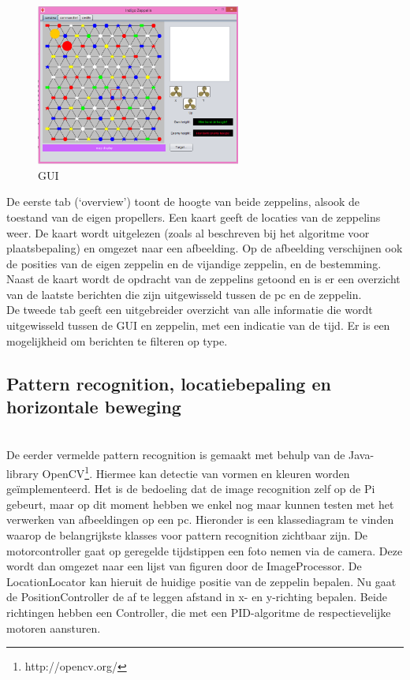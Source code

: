 \documentclass[tt]{penoverslag}
\begin{document}
\begin{figure}[H]
\begin{center}
\includegraphics[width=0.6\textwidth]{GUI.png}
\end{center}
\caption{GUI}
\label{GUI}
\end{figure}

De eerste tab (`overview') toont de hoogte van beide zeppelins, alsook de toestand van de eigen propellers. Een kaart geeft de locaties van de zeppelins weer. De kaart wordt uitgelezen (zoals al beschreven bij het algoritme voor plaatsbepaling) en omgezet naar een afbeelding. Op de afbeelding verschijnen ook de posities van de eigen zeppelin en de vijandige zeppelin, en de bestemming. Naast de kaart wordt de opdracht van de zeppelins getoond en is er een overzicht van de laatste berichten die zijn uitgewisseld tussen de pc en de zeppelin. \\

De tweede tab geeft een uitgebreider overzicht van alle informatie die wordt uitgewisseld tussen de GUI en zeppelin, met een indicatie van de tijd. Er is een mogelijkheid om berichten te filteren op type. \\



\subsection{Pattern recognition, locatiebepaling en horizontale beweging}\\
De eerder vermelde pattern recognition is gemaakt met behulp van de Java-library OpenCV\footnote{http://opencv.org/}. Hiermee kan detectie van vormen en kleuren worden ge\"{i}mplementeerd. Het is de bedoeling dat de image recognition zelf op de Pi gebeurt, maar op dit moment hebben we enkel nog maar kunnen testen met het verwerken van afbeeldingen op een pc. Hieronder is een klassediagram te vinden waarop de belangrijkste klasses voor pattern recognition zichtbaar zijn. De motorcontroller gaat op geregelde tijdstippen een foto nemen via de camera. Deze wordt dan omgezet naar een lijst van figuren door de ImageProcessor. De LocationLocator kan hieruit de huidige positie van de zeppelin bepalen. Nu gaat de PositionController de af te leggen afstand in x- en y-richting bepalen. Beide richtingen hebben een Controller, die met een PID-algoritme de respectievelijke motoren aansturen.\\
\end{document}
